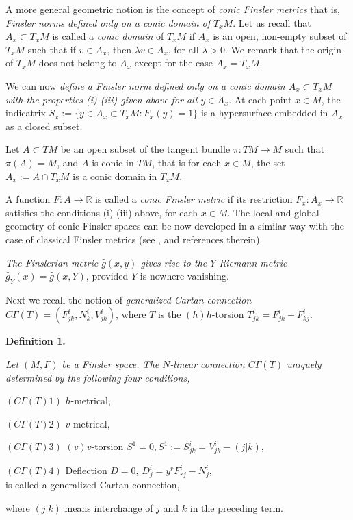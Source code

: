 \documentclass[aps,superscriptaddress, showpacs,preprintnumbers, superscriptaddress, nofootinbibt,twocolumn]{revtex4-2}
\begin{document}
A more general geometric notion is the concept of \textit{conic Finsler metrics} that
is, {\it Finsler norms defined only on a conic domain of $T_xM$}. Let us recall
that $A_x\subset T_xM$ is called a \textit{conic domain} of $T_xM$ if $A_x$
is an open, non-empty subset of $T_xM$ such that if $v\in A_x$, then $%
\lambda v\in A_x$, for all $\lambda>0$. We remark that the origin of $T_xM$
does not belong to $A_x$ except for the case $A_x=T_xM$.

We can now {\it define a
Finsler norm defined only on a conic domain $A_x\subset T_xM$ with the
properties (i)-(iii) given above for all $y\in A_x$}. At each point $x\in M$,
the indicatrix $S_x:=\{y\in A_x\subset T_xM:F_x(y)=1\}$ is a hypersurface
embedded in $A_x$ as a closed subset.

Let $A\subset TM$ be an open subset of the tangent bundle $\pi:TM\to M$ such
that $\pi(A)=M$, and $A$ is conic in $TM$, that is for each $x\in M$, the
set $A_x:=A\cap T_xM$ is a conic domain in $T_xM$.

A function $F:A\to
\mathbb{R} $ is called a {\it conic Finsler metric} if its restriction $F_x:A_x\to
\mathbb{R} $ satisfies the conditions (i)-(iii) above, for each $x\in M$.
The local and global geometry of conic Finsler spaces can be now developed
in a similar way with the case of classical Finsler metrics (see \cite{JS}, \cite{YS1}
and references therein).

{\it The Finslerian metric $\hat{g}(x,y)$ gives rise to the $Y$-Riemann metric $%
\hat{g}_{Y}(x)=\hat{g}(x,Y)$}, provided $Y$ is nowhere vanishing.

Next we recall the notion of  {\it generalized Cartan connection}
 $C\Gamma(T)=(F^i_{jk},N^i_k,V^i_{jk})$, where $T$ is the $(h)$$h$-torsion $T^i_{jk}=F^i_{jk}-F^i_{kj}$.

\bigskip
{\bf Definition 1.}  {\it Let $(M,F)$ be a Finsler space. The $N
$-linear connection $C\Gamma (T)$ uniquely determined by the following four
conditions,

$\left( C\Gamma (T)1\right) $ $h$-metrical,

$\left( C\Gamma (T)2\right) $ $v$-metrical,

$\left( C\Gamma (T)3\right) $ $(v)v$-torsion
$S^{1}=0,S^{1}:=S_{jk}^{i}=V_{jk}^{i}-(j|k)$,

$\left( C\Gamma (T)4\right) $ Deflection $D=0$, $%
D_{j}^{i}=y^{r}F_{rj}^{i}-N_{j}^{i}$,\\
is called a generalized Cartan connection,}  where $(j|k)$ means interchange of $j$ and $k$ in the preceding term.
\end{document}
